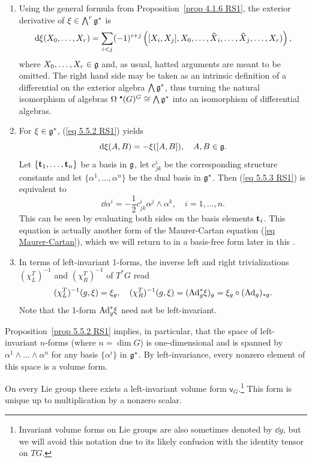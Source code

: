 \begin{rem}
\begin{enumerate}
    \item Using the general formula from Proposition~\ref{prop 4.1.6 RS1}, the exterior derivative of $\xi\in\bigwedge^r\frakg^\ast$ is
    \[\dd\xi(X_0,\ldots,X_r)=\sum_{i<j}(-1)^{i+j}\left([X_i,X_j],X_0,\ldots,\wh{X}_i,\ldots,\wh{X}_j,\ldots,X_r)\right),\label{eq 5.5.2 RS1}\]
    where $X_0,\ldots,X_r\in\frakg$ and, as usual, hatted arguments are meant to be omitted. The right hand side may be taken as an intrinsic definition of a differential on the exterior algebra $\bigwedge\frakg^\ast$, thus turning the natural isomorphism of algebras $\Omega^{\smbullet }(G)^G\cong\bigwedge\frakg^\ast$ into an isomorphism of differential algebras.
    \item For $\xi\in\frakg^\ast$, (\ref{eq 5.5.2 RS1}) yields
    \[\dd\xi(A,B)=-\xi([A,B]),\quad A,B\in\frakg.\label{eq 5.5.3 RS1}\]
    Let $\{\bf{t}_1,\ldots,\bf{t}_n\}$ be a basis in $\frakg$, let $c^i_{jk}$  be the corresponding structure constants and let $\{\alpha^1,\ldots,\alpha^n\}$ be the dual basis in $\frakg^\ast$. Then (\ref{eq 5.5.3 RS1}) is equivalent to
    \[\dd \alpha^i=-\frac 12 c^i_{jk}\alpha^j\wedge \alpha^k,\quad i=1,\ldots,n.\label{eq 5.5.4 RS1 MC in coords}\]
    This can be seen by evaluating both sides on the basis elements $\bf{t}_i$. This equation is actually another form of the Maurer-Cartan equation  (\ref{eq Maurer-Cartan}), which we will return to in a basis-free form later in this \subsect.
    \item In terms of left-invariant 1-forms, the inverse left and right trivializations $(\chi_L^T)^{-1}$ and $(\chi_R^T)^{-1}$ of $T^\ast G$ read
    \[(\chi_L^T)^{-1}(g,\xi)=\xi_g,\quad (\chi_R^T)^{-1}(g,\xi)=(\Ad_{g}^\ast \xi)_g=\xi_g\circ (\Ad_g)_{\ast g}.\]
    Note that the 1-form $\Ad_g^\ast\xi$ need not be left-invariant.
\end{enumerate}
\end{rem}

Proposition~\ref{prop 5.5.2 RS1} implies, in particular, that the space of left-invariant $n$-forms (where $n=\dim G$) is one-dimensional and is spanned by $\alpha^1\wedge\ldots\wedge\alpha^n$ for any basis $\{\alpha^i\}$ in $\frakg^\ast$. By left-invariance, every nonzero element of this space is a volume form.

\begin{cor}
    On every Lie group there exists a left-invariant volume form $\mathsf{v}_G$.\footnote{Invariant volume forms on Lie groups are also sometimes denoted by $\dd g$, but we will avoid this notation due to its likely confusion with the identity tensor on $TG$.} This form is unique up to multiplication by a nonzero scalar. 
\end{cor}

